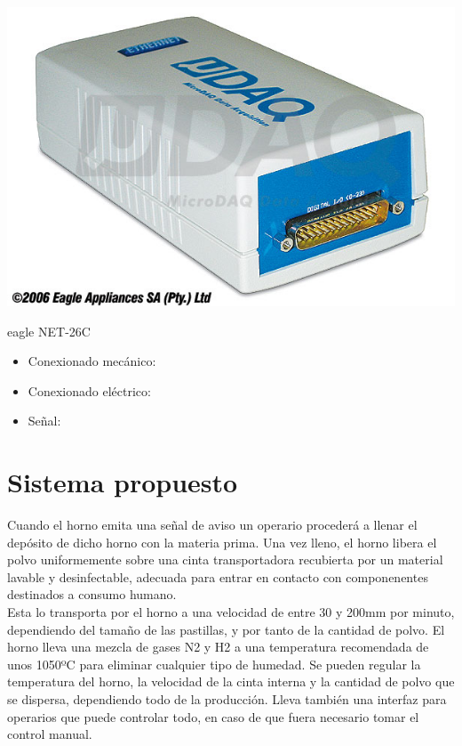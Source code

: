 	\includegraphics[scale=0.4]{Datasheets/10Foto.jpg}

	eagle NET-26C 
		\begin{itemize}
				\item{Conexionado mecánico:}\\
				
				\item{Conexionado eléctrico:}\\
				
				\item{Señal:}\\
				
		\end{itemize}

\newpage

	

\section{Sistema propuesto}


Cuando el horno emita una señal de aviso un operario procederá a llenar el depósito de dicho horno con la materia prima. Una vez lleno, el horno libera el polvo uniformemente sobre una cinta transportadora recubierta por un material lavable y desinfectable, adecuada para entrar en contacto con componenentes destinados a consumo humano. \\
Esta lo transporta por el horno a una velocidad de entre 30 y 200mm por minuto, dependiendo del tamaño de las pastillas, y por tanto de la cantidad de polvo. El horno lleva una mezcla de gases N2 y H2 a una temperatura recomendada de unos 1050ºC para eliminar cualquier tipo de humedad. Se pueden regular la temperatura del horno, la velocidad de la cinta interna y la cantidad de polvo que se dispersa, dependiendo todo de la producción. Lleva también una interfaz para operarios que puede controlar todo, en caso de que fuera necesario tomar el control manual.
\\

